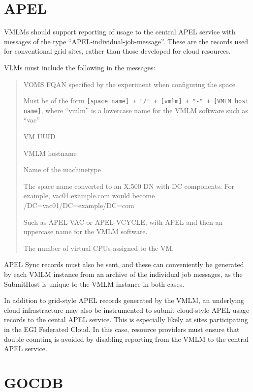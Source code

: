 \documentclass[12pt,a4paper]{article}
\begin{document}
\section{APEL}
\label{sec:apel}

VMLMs should support reporting of usage to the central APEL service
with messages of the type ``APEL-individual-job-message''. These are
the records used for conventional grid sites, rather than those developed
for cloud resources. 

VLMs must include the following in the messages:
\begin{quote}
\begin{description}
\setlength{\parskip}{0pt}
\item[FQAN] VOMS FQAN specified by the experiment when configuring the space
\item[SubmitHost] Must be of the form 
  \texttt{[space name] + "/" + [vmlm] + "-" + [VMLM host name]}, where
  ``vmlm'' is a lowercase name for the VMLM software such as ``vac''
\item[LocalJobId] VM UUID
\item[LocalUserId] VMLM hostname
\item[Queue] Name of the machinetype
\item[GlobalUserName] The space name converted to an X.500 DN with DC
  components. For example, vac01.example.com would become /DC=vac01/DC=example/DC=com
\item[InfrastructureDescription] Such as APEL-VAC or APEL-VCYCLE, with APEL and then
  an uppercase name for the VMLM software.
\item[Processors] The number of virtual CPUs assigned to the VM.
\end{description}
\end{quote}

APEL Sync records must also be sent, and these can conveniently be
generated by each VMLM instance from an archive of the individual
job messages, as the SubmitHost is unique to the VMLM instance
in both cases.

In addition to grid-style APEL records generated by the VMLM, an underlying
cloud infrastracture may also be instrumented to submit cloud-style APEL 
usage records to the cental APEL service.
This is especially likely at sites participating in the EGI Federated Cloud.
In this case, resource providers must ensure that double counting is avoided
by disabling reporting from the VMLM to the central APEL service. 

\section{GOCDB}
\label{sec:gocdb}
\end{document}
